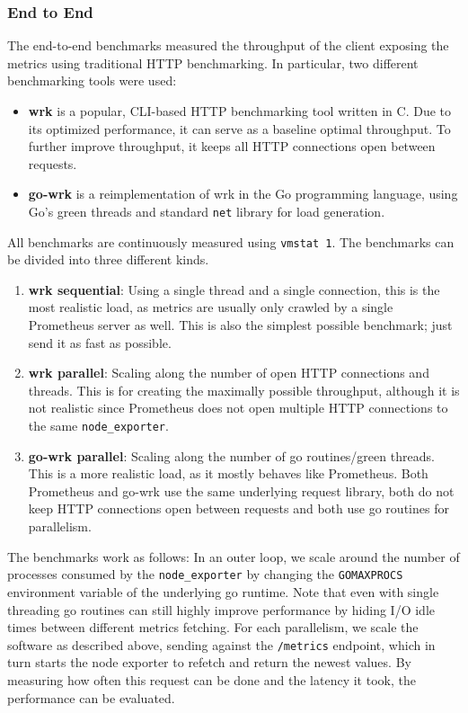 \subsubsection{End to End}
The end-to-end benchmarks measured the throughput of the client exposing the metrics using traditional HTTP benchmarking. In particular, two different
benchmarking tools were used:
\begin{itemize}
  \item \textbf{wrk} \cite{wrk} is a popular, CLI-based HTTP benchmarking tool written in C. Due to its optimized
    performance, it can serve as a baseline optimal throughput. To further improve throughput, it keeps
    all HTTP connections open between requests.
  \item \textbf{go-wrk} \cite{go-wrk} is a reimplementation of wrk in the Go programming language, using Go's
    green threads and standard \texttt{net} library for load generation.
\end{itemize}
All benchmarks are continuously measured using \texttt{vmstat 1}. The benchmarks can be divided into three different kinds.
\begin{enumerate}
  \item \textbf{wrk sequential}: Using a single thread and a single connection, this is the most realistic load,
    as metrics are usually only crawled by a single Prometheus server as well. This is also the simplest possible benchmark;
    just send it as fast as possible.
  \item \textbf{wrk parallel}: Scaling along the number of open HTTP connections and threads. This is for creating the maximally possible throughput, although it is not realistic since Prometheus does not open multiple HTTP connections to the same \texttt{node\_exporter}.
  \item \textbf{go-wrk parallel}: Scaling along the number of go routines/green threads. This is a more realistic load, as it mostly behaves like Prometheus. Both Prometheus and go-wrk use the same underlying request library, both do not keep HTTP connections open between requests and both use go routines for parallelism.
\end{enumerate}
The benchmarks work as follows: In an outer loop, we scale around the number of processes consumed by the \texttt{node\_exporter} by changing the \texttt{GOMAXPROCS} environment variable of the underlying go runtime. Note that even with single threading go routines can still highly improve performance by hiding I/O idle times between different metrics fetching. For each parallelism, we scale the software as described above, sending against the \texttt{/metrics} endpoint, which in turn starts the node exporter to refetch and return the newest values. By measuring how often this request can be done and the latency it took, the performance can be evaluated.

